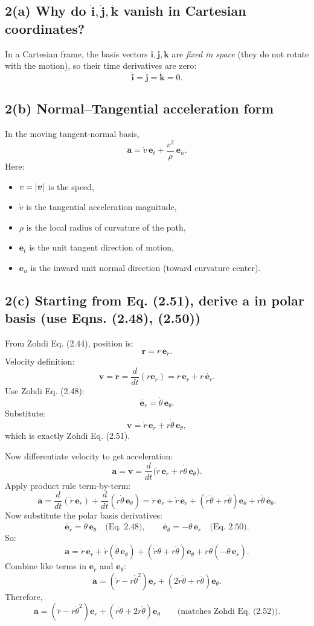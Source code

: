 \documentclass[12pt]{article}
\begin{document}
\subsection*{2(a) Why do $\dot{\bm i}, \dot{\bm j}, \dot{\bm k}$ vanish in Cartesian coordinates?}

In a Cartesian frame, the basis vectors $\bm i,\bm j,\bm k$ are \emph{fixed in space} (they do not rotate with the motion),
so their time derivatives are zero:
\[
\boxed{\dot{\bm i}=\dot{\bm j}=\dot{\bm k}=0.}
\]

\subsection*{2(b) Normal--Tangential acceleration form}

In the moving tangent-normal basis,
\[
\boxed{\bm a = \dot v\,\bm e_t + \frac{v^2}{\rho}\,\bm e_n.}
\]
Here:
\begin{itemize}
\item $v=\abs{\bm v}$ is the speed,
\item $\dot v$ is the tangential acceleration magnitude,
\item $\rho$ is the local radius of curvature of the path,
\item $\bm e_t$ is the unit tangent direction of motion,
\item $\bm e_n$ is the inward unit normal direction (toward curvature center).
\end{itemize}

\newpage
\subsection*{2(c) Starting from Eq. (2.51), derive $\bm a$ in polar basis (use Eqns. (2.48), (2.50))}

From Zohdi Eq. (2.44), position is:
\[
\bm r = r\,\bm e_r.
\]
Velocity definition:
\[
\bm v = \dot{\bm r} = \frac{d}{dt}(r\bm e_r)
     = \dot r\,\bm e_r + r\,\dot{\bm e_r}.
\]
Use Zohdi Eq. (2.48):
\[
\dot{\bm e_r} = \dot\theta\,\bm e_\theta.
\]
Substitute:
\[
\bm v = \dot r\,\bm e_r + r\dot\theta\,\bm e_\theta,
\]
which is exactly Zohdi Eq. (2.51).

Now differentiate velocity to get acceleration:
\[
\bm a = \dot{\bm v}
= \frac{d}{dt}\Big(\dot r\,\bm e_r + r\dot\theta\,\bm e_\theta\Big).
\]
Apply product rule term-by-term:
\[
\bm a
= \frac{d}{dt}(\dot r\,\bm e_r) + \frac{d}{dt}(r\dot\theta\,\bm e_\theta)
= \ddot r\,\bm e_r + \dot r\,\dot{\bm e_r}
  + (\dot r\dot\theta + r\ddot\theta)\bm e_\theta + r\dot\theta\,\dot{\bm e_\theta}.
\]
Now substitute the polar basis derivatives:
\[
\dot{\bm e_r} = \dot\theta\,\bm e_\theta \quad \text{(Eq. 2.48)},\qquad
\dot{\bm e_\theta} = -\dot\theta\,\bm e_r \quad \text{(Eq. 2.50)}.
\]
So:
\[
\bm a
= \ddot r\,\bm e_r + \dot r(\dot\theta\,\bm e_\theta)
  + (\dot r\dot\theta + r\ddot\theta)\bm e_\theta
  + r\dot\theta(-\dot\theta\,\bm e_r).
\]
Combine like terms in $\bm e_r$ and $\bm e_\theta$:
\[
\bm a
= (\ddot r - r\dot\theta^2)\bm e_r
+ (2\dot r\dot\theta + r\ddot\theta)\bm e_\theta.
\]
Therefore,
\[
\boxed{\bm a = (\ddot r - r\dot\theta^2)\bm e_r + (r\ddot\theta + 2\dot r\dot\theta)\bm e_\theta}
\qquad \text{(matches Zohdi Eq. (2.52)).}
\]
\end{document}
